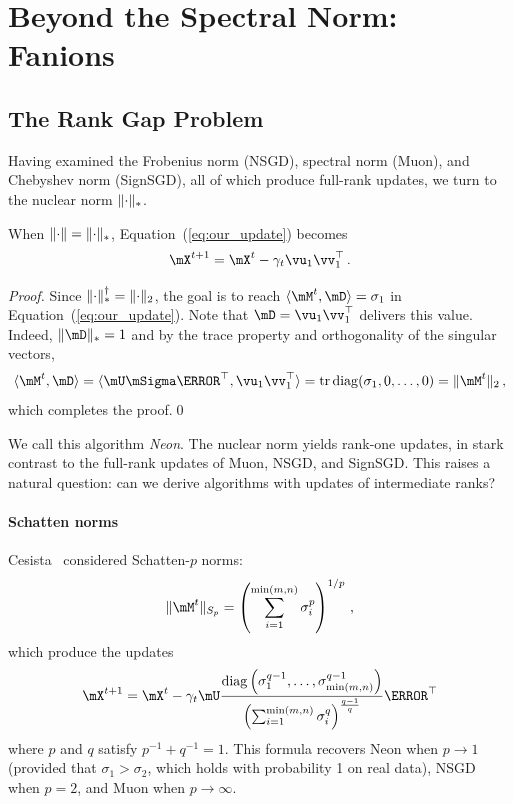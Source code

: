 \documentclass[smallextended,referee,envcountsect]{svjour3}
\newcommand{\norm}[1]{\lVert #1\rVert}
\DeclarePairedDelimiter{\norms}{\|}{\|_{\mathrm{2}}}
\DeclarePairedDelimiter{\normn}{\|}{\|_{*}}
\def\<#1,#2>{\langle #1,#2\rangle}
\DeclareMathOperator{\tr}{tr}
\DeclareMathOperator{\diag}{diag}
\newcommand{\equationref}[1]{Equation~(\ref{#1})}
\begin{document}
 \section{Beyond the Spectral Norm: Fanions}
 
 \subsection{The Rank Gap Problem}
 
 Having examined the Frobenius norm (NSGD), spectral norm (Muon), and Chebyshev norm (SignSGD), all of which produce full-rank updates, we turn to the nuclear norm $\normn{\cdot}$.
 
 \begin{lemma}\label{lemma:neon_update}
   When $\norm{\cdot} = \normn{\cdot}$, \equationref{eq:our_update} becomes
   \begin{equation}\label{eq:neon_update}
     \mX^{t+1} = \mX^{t} - \gamma_t \vu_1 \vv_1^\top\,.
   \end{equation}
 \end{lemma}
 \begin{proof}
 Since $\normn{\cdot}^\dagger = \norms{\cdot}$, the goal is to reach $\<\mM^t, \mD> = \sigma_1$ in \equationref{eq:our_update}. Note that $\mD = \vu_1 \vv_1^\top$ delivers this value. Indeed, $\normn{\mD}=1$ and by the trace property and orthogonality of the singular vectors,
 \[
 \<\mM^t, \mD> =\<\mU \mSigma \mV^\top, \vu_1 \vv_1^\top> = \tr \diag({\sigma_1, 0, \dots, 0}) = \norms{\mM^t}\,,
 \]
 which completes the proof.\qed
\end{proof}
 
 We call this algorithm \emph{Neon}. The nuclear norm yields rank-one updates, in stark contrast to the full-rank updates of Muon, NSGD, and SignSGD. This raises a natural question: can we derive algorithms with updates of intermediate ranks?
 
 \paragraph{Schatten norms}
 Cesista~\cite{cesista2025schattenp} considered Schatten-$p$ norms:
 \[\norm{\mM^t}_{S_p} = \left(\sum_{i=1}^{\min(m, n)}\sigma_i^p\right)^{1/p}\,,
 \]
 which produce the updates
 \[
 \mX^{t+1} = \mX^t - \gamma_t \mU \frac{\diag\left(\sigma_1^{q-1},\dots, \sigma_{\min(m,n)}^{q-1}\right)}{\left(\sum_{i=1}^{\min(m,n)}{\sigma_i^q}\right)^{\frac{q-1}{q}}}\mV^\top
 \]
 where $p$ and $q$ satisfy $p^{-1} + q^{-1} = 1$. This formula recovers Neon when $p\rightarrow1$ (provided that $\sigma_1 > \sigma_2$, which holds with probability 1 on real data), NSGD when $p=2$, and Muon when $p\rightarrow\infty$.
 
\end{document}

